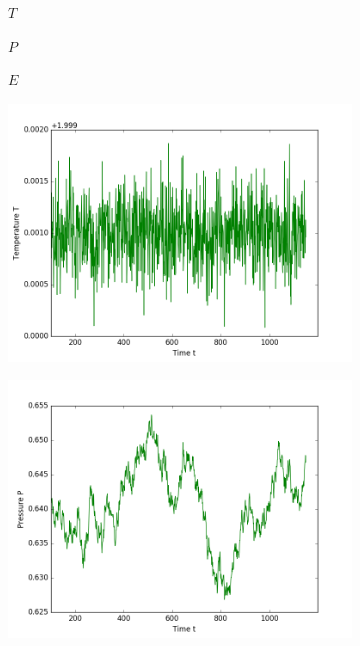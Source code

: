\begin{figure}[ht]
\hfill
\begin{subfigure}{0.3\textwidth}
\centering
$T$
\end{subfigure}
\hfill
\begin{subfigure}{0.3\textwidth}
\centering
$P$
\end{subfigure}
\hfill
\begin{subfigure}{0.3\textwidth}
\centering
$E$
\end{subfigure}

\begin{subfigure}{0.3\textwidth}
\includegraphics[width=\textwidth]{fig/avTemperature_T2d0_F20d0_M100.png}
\end{subfigure}
\hfill
\begin{subfigure}{0.3\textwidth}
\includegraphics[width=\textwidth]{fig/avPressure_T2d0_F20d0_M100.png}

\end{subfigure}
\end{figure}
